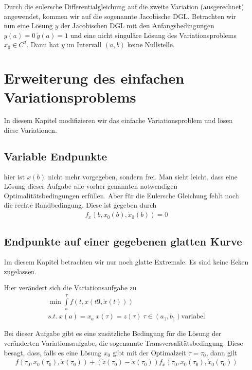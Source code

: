 \documentclass[pdftex,a4paper,oneside]{scrbook}
\begin{document}
	Durch die eulersche Differentialgleichung auf die zweite Variation (ausgerechnet) angewendet, kommen wir auf die sogenannte Jacobische DGL. Betrachten wir nun eine Lösung $y$ der Jacobischen DGL mit den Anfangsbedingungen $y(a)=0 \: \dot{y}(a)=1$ und eine nicht singuläre Lösung des Variationsproblems $x_0 \in C^2$. Dann hat $y$ im Intervall $(a,b)$ keine Nullstelle.   
	
	
	\section{Erweiterung des einfachen Variationsproblems}
	In diesem Kapitel modifizieren wir das einfache Variationsproblem und lösen diese Variationen. 
	
	\subsection{Variable Endpunkte}
	hier ist $x(b)$ nicht mehr vorgegeben, sondern frei. Man sieht leicht, dass eine Lösung dieser Aufgabe alle vorher genannten notwendigen Optimalitätsbedingungen erfüllen. Aber für die Eulersche Gleichung fehlt noch die rechte Randbedingung. Diese ist gegeben durch
	\begin{align*}
	f_{\dot{x}}(b,x_0(b),\dot{x}_0(b) ) = 0
	\end{align*} 
	
	\subsection{Endpunkte auf einer gegebenen glatten Kurve}
	Im diesem Kapitel betrachten wir nur noch glatte Extremale. Es sind keine Ecken zugelassen. 
	
	Hier verändert sich die Variationsaufgabe zu 
	\begin{align*}
	\min \int\limits_{a}^{\tau} f(t, x(t9, \dot{x}(t))) \\
	s.t. \: x(a)=x_a \: x(\tau) = z(\tau) \: \tau \in (a_1,b_1) \text{variabel} 
	\end{align*}
	
	Bei dieser Aufgabe gibt es eine zusätzliche Bedingung für die Lösung der veränderten Variationsaufgabe, die sogenannte Transversalitätsbedingung. Diese besagt, dass, falls es eine Lösung $x_0$ gibt mit der Optimalzeit $\tau = \tau_0$, dann gilt
	\begin{align*}
	f(\tau_0, x_0(\tau_0), \dot{x}(\tau_0)) + \left( \dot{z}(\tau_0) - \dot{x}(\tau_0) \right) f_{\dot{x}}(\tau_0,x_0(\tau_0), \dot{x}_0(\tau_0))
	\end{align*}
	
\end{document}
